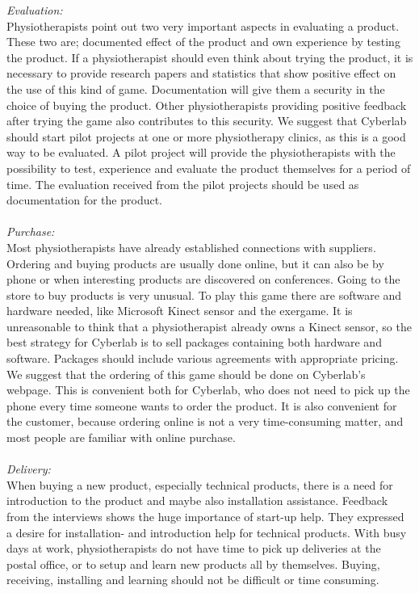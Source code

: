 \emph{Evaluation:}\\
Physiotherapists point out two very important aspects in evaluating a product. These two are; documented effect of the product and own experience by testing the product. If a physiotherapist should even think about trying the product, it is necessary to provide research papers and statistics that show positive effect on the use of this kind of game. Documentation will give them a security in the choice of buying the product. Other physiotherapists providing positive feedback after trying the game also contributes to this security. We suggest that Cyberlab should start pilot projects at one or more physiotherapy clinics, as this is a good way to be evaluated. A pilot project will provide the physiotherapists with the possibility to test, experience and evaluate the product themselves for a period of time. The evaluation received from the pilot projects should be used as documentation for the product.\\ \\
\emph{Purchase:} \\
Most physiotherapists have already established connections with suppliers. Ordering and buying products are usually done online, but it can also be by phone or when interesting products are discovered on conferences. Going to the store to buy products is very unusual. To play this game there are software and hardware needed, like Microsoft Kinect sensor and the exergame. It is unreasonable to think that a physiotherapist already owns a Kinect sensor, so the best strategy for Cyberlab is to sell packages containing both hardware and software. Packages should include various agreements with appropriate pricing. We suggest that the ordering of this game should be done on Cyberlab's webpage. This is convenient both for Cyberlab, who does not need to pick up the phone every time someone wants to order the product. It is also convenient for the customer, because ordering online is not a very time-consuming matter, and most people are familiar with online purchase. \\ \\
\emph{Delivery:}\\
When buying a new product, especially technical products, there is a need for introduction to the product and maybe also installation assistance. Feedback from the interviews shows the huge importance of start-up help. They expressed a desire for installation- and introduction help for technical products. With busy days at work, physiotherapists do not have time to pick up deliveries at the postal office, or to setup and learn new products all by themselves. Buying, receiving, installing and learning should not be difficult or time consuming. \\ \\
